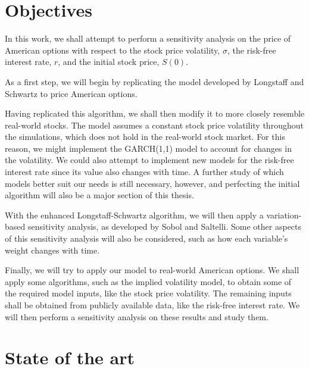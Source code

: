 \documentclass[a4paper,twocolumn,aps,prd,longbibliography,superscriptaddress]{revtex4-1}
\begin{document}
\section{Objectives}
In this work, we shall attempt to perform a sensitivity analysis on the price of American options with respect to the stock price volatility, $\sigma$, the risk-free interest rate, $r$, and the initial stock price, $S(0)$.

As a first step, we will begin by replicating the model developed by Longstaff and Schwartz to price American options.

Having replicated this algorithm, we shall then modify it to more closely resemble real-world stocks.
The model assumes a constant stock price volatility throughout the simulations, which does not hold in the real-world stock market. For this reason, we might implement the GARCH(1,1) model to account for changes in the volatility.
We could also attempt to implement new models for the risk-free interest rate since its value also changes with time.
A further study of which models better suit our needs is still necessary, however, and perfecting the initial algorithm will also be a major section of this thesis.

With the enhanced Longstaff-Schwartz algorithm, we will then apply a variation-based sensitivity analysis, as developed by Sobol and Saltelli.
Some other aspects of this sensitivity analysis will also be considered, such as how each variable's weight changes with time.

Finally, we will try to apply our model to real-world American options.
We shall apply some algorithms, such as the implied volatility model, to obtain some of the required model inputs, like the stock price volatility. The remaining inputs shall be obtained from publicly available data, like the risk-free interest rate.
We will then perform a sensitivity analysis on these results and study them.

\section{State of the art}
\end{document}
